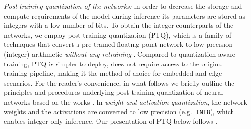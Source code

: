 \documentclass[lettersize,journal]{IEEEtran}
\begin{document}
\noindent \textit{Post-training quantization of the networks:} In order to decrease the storage and compute requirements of the model during inference its parameters are  stored as integers with a low number of bits. To obtain the integer counterparts of the  networks, we employ post-training quantization (PTQ), which is a family of techniques that convert a pre-trained floating point network to low-precision (integer) arithmetic \emph{without any retraining} \cite{jacob2018quantization, krishnamoorthi2018quantizing}. Compared to quantization-aware training, PTQ is simpler to deploy, does not require   access to the original training pipeline, making it the method of choice for embedded and edge scenarios. For the reader’s convenience, in what follows we briefly outline the principles and procedures underlying post-training quantization of neural networks based on the works \cite{jacob2018quantization, krishnamoorthi2018quantizing}.
In \emph{weight and activation quantization}, the network weights and the activations are converted to low precision (e.g., \texttt{INT8}), which enables integer-only inference. Our presentation of  PTQ below follows  \cite{krishnamoorthi2018quantizing}.
\end{document}
